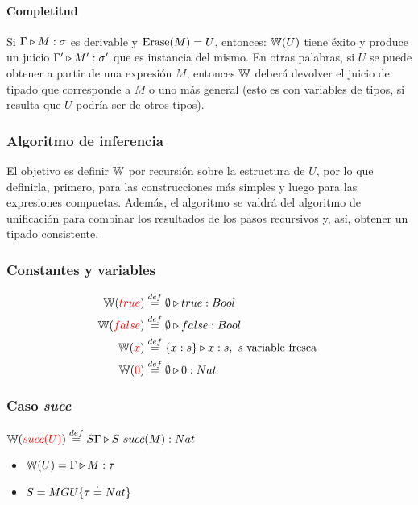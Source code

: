 \paragraph{Completitud} Si $\Gamma\triangleright M : \sigma$ es derivable y $\operatorname{Erase}(M) = U$, entonces:
$\mathbb{W}(U)$ tiene éxito y produce un juicio $\Gamma'\triangleright M' : \sigma'$ que es instancia del mismo. En otras palabras, si $U$ se puede obtener a partir de una expresión $M$, entonces $\mathbb{W}$ deberá devolver el juicio de tipado que corresponde a $M$ o uno más general (esto es con variables de tipos, si resulta que $U$ podría ser de otros tipos).

\subsubsection{Algoritmo de inferencia}
El objetivo es definir $\mathbb{W}$ por recursión sobre la estructura de $U$, por lo que definirla, primero, para las construcciones más simples y luego para las expresiones compuetas. Además, el algoritmo se valdrá del algoritmo de unificación para combinar los resultados de los pasos recursivos y, así, obtener un tipado consistente.

\subsubsection{Constantes y variables}
\begin{equation*}
	\begin{split}
		\mathbb{W}({\color{red}true}) &\overset{def}{=} \emptyset\triangleright true : Bool \\
		\mathbb{W}({\color{red}false}) &\overset{def}{=} \emptyset\triangleright false : Bool \\
		\mathbb{W}({\color{red}x}) &\overset{def}{=} \{x:s\}\triangleright x : s, \text{ \textit{s} variable fresca } \\
		\mathbb{W}({\color{red}0}) &\overset{def}{=} \emptyset\triangleright 0 : Nat \\
	\end{split}
\end{equation*}

\subsubsection{Caso \textit{succ}}
$\mathbb{W}({\color{red}succ(U)}) \overset{def}{=} S\Gamma\triangleright S~succ(M) : Nat$
\begin{centrado}
	\begin{itemize}
		\item $\mathbb{W}(U) = \Gamma\triangleright M : \tau$
		\item $S = MGU\{\tau\overset{\cdot}{=} Nat\}$
	\end{itemize}
\end{centrado}

